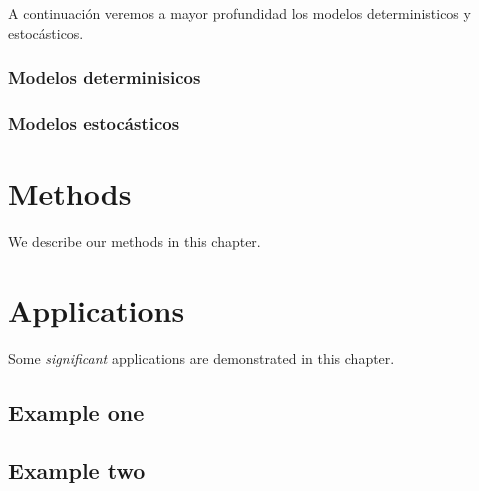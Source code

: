 \documentclass[
]{book}
\begin{document}
A continuación veremos a mayor profundidad los modelos deterministicos y estocásticos.

\hypertarget{modelos-determinisicos}{%
\subsection{Modelos determinisicos}\label{modelos-determinisicos}}

\hypertarget{modelos-estocuxe1sticos}{%
\subsection{Modelos estocásticos}\label{modelos-estocuxe1sticos}}

\hypertarget{methods}{%
\chapter{Methods}\label{methods}}

We describe our methods in this chapter.

\hypertarget{applications}{%
\chapter{Applications}\label{applications}}

Some \emph{significant} applications are demonstrated in this chapter.

\hypertarget{example-one}{%
\section{Example one}\label{example-one}}

\hypertarget{example-two}{%
\section{Example two}\label{example-two}}

  
\end{document}
